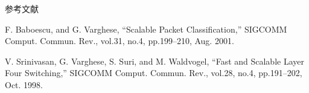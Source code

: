 \documentclass[12pt,dvipdfmx,mathserif,uplatex,aspectratio=32]{beamer}
\begin{document}
\begin{frame}{参考文献}

{\scriptsize
\begin{thebibliography}{99}
\setlength{\itemsep}{-.5zw}
\beamertemplatetextbibitems

 F. Baboescu, and G. Varghese, “Scalable Packet Classification,” SIGCOMM Comput. Commun. Rev., vol.31, no.4, pp.199–210, Aug. 2001. 
\vspace{5mm}

 V. Srinivasan, G. Varghese, S. Suri, and M. Waldvogel, “Fast and Scalable Layer Four Switching,” SIGCOMM Comput. Commun. Rev., vol.28, no.4, pp.191–202, Oct. 1998.

\end{thebibliography}
}

\end{frame}
\end{document}
